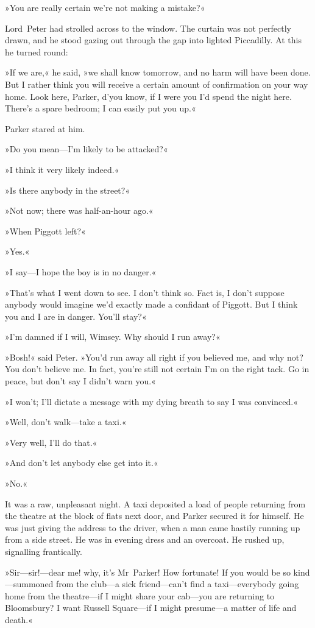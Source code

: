 »You are really certain we're not making a mistake?«

Lord~Peter had strolled across to the window. The curtain was not perfectly drawn, and he stood gazing out through the gap into lighted Piccadilly. At this he turned round:

»If we are,« he said, »we shall know tomorrow, and no harm will have been done. But I rather think you will receive a certain amount of confirmation on your way home. Look here, Parker, d'you know, if I were you I'd spend the night here. There's a spare bedroom; I can easily put you up.«

Parker stared at him.

»Do you mean—I'm likely to be attacked?«

»I think it very likely indeed.«

»Is there anybody in the street?«

»Not now; there was half-an-hour ago.«

»When Piggott left?«

»Yes.«

»I say—I hope the boy is in no danger.«

»That's what I went down to see. I don't think so. Fact is, I don't suppose anybody would imagine we'd exactly made a confidant of Piggott. But I think you and I are in danger. You'll stay?«

»I'm damned if I will, Wimsey. Why should I run away?«

»Bosh!« said Peter. »You'd run away all right if you believed me, and why not? You don't believe me. In fact, you're still not certain I'm on the right tack. Go in peace, but don't say I didn't warn you.«

»I won't; I'll dictate a message with my dying breath to say I was convinced.«

»Well, don't walk—take a taxi.«

»Very well, I'll do that.«

»And don't let anybody else get into it.«

»No.«

It was a raw, unpleasant night. A taxi deposited a load of people returning from the theatre at the block of flats next door, and Parker secured it for himself. He was just giving the address to the driver, when a man came hastily running up from a side street. He was in evening dress and an overcoat. He rushed up, signalling frantically.

»Sir—sir!---dear me! why, it's Mr~Parker! How fortunate! If you would be so kind—summoned from the club—a sick friend—can't find a taxi—everybody going home from the theatre—if I might share your cab—you are returning to Bloomsbury? I want Russell Square—if I might presume—a matter of life and death.«

